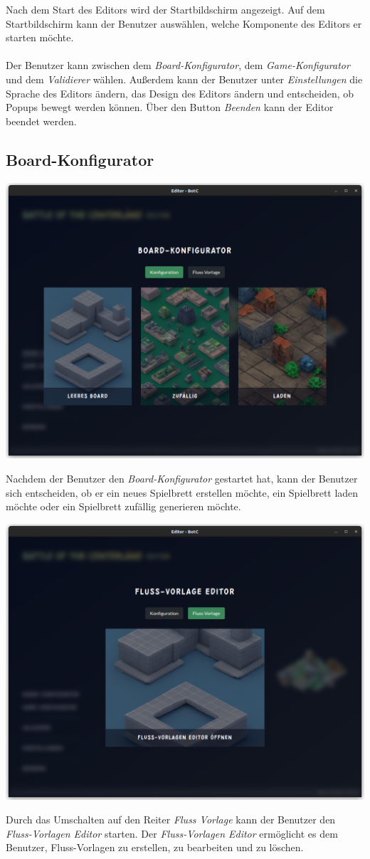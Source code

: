 \documentclass[12pt]{gruppe-11-article-a5}
\begin{document}
	Nach dem Start des Editors wird der Startbildschirm angezeigt.
	Auf dem Startbildschirm kann der Benutzer auswählen, welche Komponente des Editors er starten möchte.
	\\\\
	Der Benutzer kann zwischen dem \emph{Board-Konfigurator}, dem \emph{Game-Konfigurator} und dem \emph{Validierer} wählen.
	Außerdem kann der Benutzer unter \emph{Einstellungen} die Sprache des Editors ändern, das Design des Editors ändern und entscheiden, ob Popups bewegt werden können.
	Über den Button \emph{Beenden} kann der Editor beendet werden.

	\subsection{Board-Konfigurator}\label{subsec:board-konfigurator}

	\includegraphics[width=\textwidth]{./Handbuch/assets/Board-Konfigurator-Choice}

	Nachdem der Benutzer den \emph{Board-Konfigurator} gestartet hat, kann der Benutzer sich entscheiden, ob er ein neues Spielbrett erstellen möchte, ein Spielbrett laden möchte oder ein Spielbrett zufällig generieren möchte.

	\includegraphics[width=\textwidth]{./Handbuch/assets/Board-Konfigurator-Choice-River-Presets}

	Durch das Umschalten auf den Reiter \emph{Fluss Vorlage} kann der Benutzer den \emph{Fluss-Vorlagen Editor} starten.
	Der \emph{Fluss-Vorlagen Editor} ermöglicht es dem Benutzer, Fluss-Vorlagen zu erstellen, zu bearbeiten und zu löschen.
\end{document}
